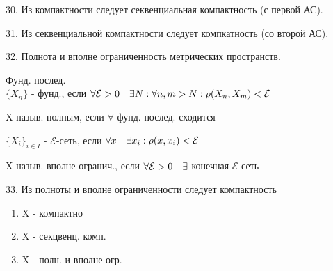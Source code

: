 \documentclass[11pt, fleqn]{article}
\begin{document}
    \begin{question}{30. Из компактности следует секвенциальная компактность (с первой АС).}

    \end{question}

    \begin{question}{31. Из секвенциальной компактности следует компкатность (со второй АС).}

    \end{question}

    \begin{question}{32. Полнота и вполне ограниченность метрических пространств.}
        \begin{definition}
            Фунд. послед.\\
            $\{X_n\}$ - фунд., если $\forall \mathcal{E} > 0 \quad \exists N: \forall n, m > N: \rho(X_n, X_m) < \mathcal{E}$
        \end{definition}

        \begin{definition}
            X назыв. полным, если $\forall$ фунд. послед. сходится
        \end{definition}

        \begin{definition}
            $\{X_i\}_{i \in I}$ - $\mathcal{E}$-сеть, если $\forall x \quad \exists x_i: \rho(x, x_i) < \mathcal{E}$
        \end{definition}

        \begin{definition}
            X назыв. вполне огранич., если $\forall \mathcal{E} > 0 \quad \exists$ конечная $\mathcal{E}$-сеть
        \end{definition}
    \end{question}

    \begin{question}{33. Из полноты и вполне ограниченности следует компактность}
        \begin{theorem} [равносильные]
                \begin{enumerate}
                    \item X - компактно
                    \item X - секцвенц. комп.
                    \item X - полн. и вполне огр.
                \end{enumerate}
        \end{theorem}
    \end{question}
\end{document}
